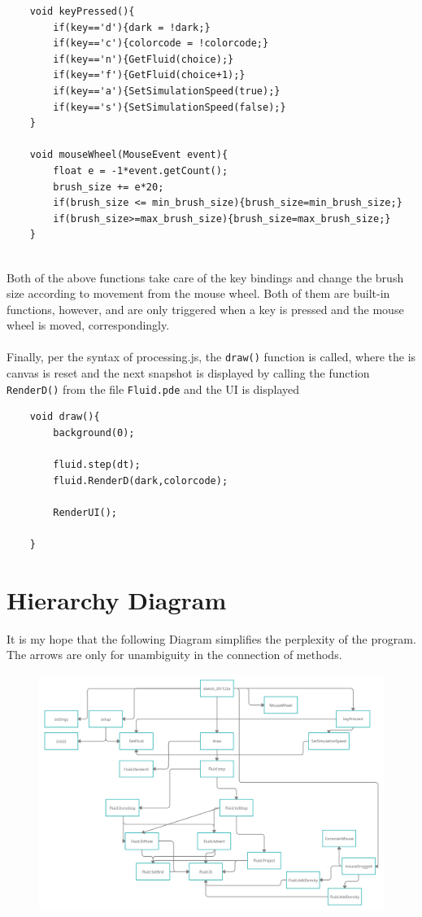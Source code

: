\documentclass[12pt,a4paper]{book}
\begin{document}
\begin{lstlisting}
	void keyPressed(){
		if(key=='d'){dark = !dark;}
		if(key=='c'){colorcode = !colorcode;}
		if(key=='n'){GetFluid(choice);}
		if(key=='f'){GetFluid(choice+1);}
		if(key=='a'){SetSimulationSpeed(true);}
		if(key=='s'){SetSimulationSpeed(false);}
	}
	
	void mouseWheel(MouseEvent event){
		float e = -1*event.getCount();
		brush_size += e*20;
		if(brush_size <= min_brush_size){brush_size=min_brush_size;}
		if(brush_size>=max_brush_size){brush_size=max_brush_size;}
	}
	
\end{lstlisting}
Both of the above functions take care of the key bindings and change the brush size according to movement from the mouse wheel. Both of them are built-in functions, however, and are only triggered when a key is pressed and the mouse wheel is moved, correspondingly.\\
\\
Finally, per the syntax of processing.js, the \verb|draw()| function is called, where the is canvas is reset and the next snapshot is displayed by calling the function \verb|RenderD()| from the file \verb|Fluid.pde| and the UI is displayed
\begin{lstlisting}
	void draw(){
		background(0);
		
		fluid.step(dt);
		fluid.RenderD(dark,colorcode);
		
		RenderUI();
		
	}
\end{lstlisting}


\section{Hierarchy Diagram}
It is my hope that the following Diagram simplifies the perplexity of the program. The arrows are only for unambiguity in the connection of methods.
\begin{landscape}
\begin{figure}[H]
	\includegraphics[scale=0.2]{pics/Hierarchy.png}
\end{figure}
\end{landscape}
\end{document}
